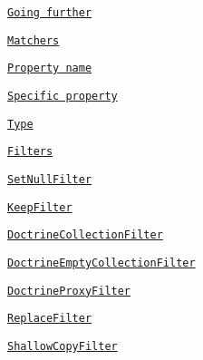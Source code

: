 \begin{DoxyEnumerate}
\item \href{#going-further}{\tt Going further}
\begin{DoxyEnumerate}
\item \href{#matchers}{\tt Matchers}
\begin{DoxyEnumerate}
\item \href{#property-name}{\tt Property name}
\end{DoxyEnumerate}
\begin{DoxyEnumerate}
\item \href{#specific-property}{\tt Specific property}
\end{DoxyEnumerate}
\begin{DoxyEnumerate}
\item \href{#type}{\tt Type}
\end{DoxyEnumerate}
\end{DoxyEnumerate}
\begin{DoxyEnumerate}
\item \href{#filters}{\tt Filters}
\begin{DoxyEnumerate}
\item \href{#setnullfilter-filter}{\tt {\ttfamily Set\+Null\+Filter}}
\end{DoxyEnumerate}
\begin{DoxyEnumerate}
\item \href{#keepfilter-filter}{\tt {\ttfamily Keep\+Filter}}
\end{DoxyEnumerate}
\begin{DoxyEnumerate}
\item \href{#doctrinecollectionfilter-filter}{\tt {\ttfamily Doctrine\+Collection\+Filter}}
\end{DoxyEnumerate}
\begin{DoxyEnumerate}
\item \href{#doctrineemptycollectionfilter-filter}{\tt {\ttfamily Doctrine\+Empty\+Collection\+Filter}}
\end{DoxyEnumerate}
\begin{DoxyEnumerate}
\item \href{#doctrineproxyfilter-filter}{\tt {\ttfamily Doctrine\+Proxy\+Filter}}
\end{DoxyEnumerate}
\begin{DoxyEnumerate}
\item \href{#replacefilter-type-filter}{\tt {\ttfamily Replace\+Filter}}
\end{DoxyEnumerate}
\begin{DoxyEnumerate}
\item \href{#doctrinecollectionfilter-type-filter}{\tt {\ttfamily Shallow\+Copy\+Filter}}
\end{DoxyEnumerate}
\end{DoxyEnumerate}
\end{DoxyEnumerate}
